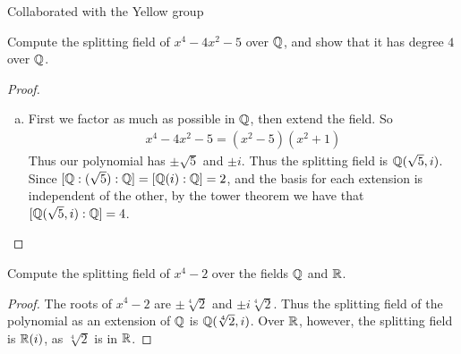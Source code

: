 \documentclass[num=7,duedate=03-24-21,course=Algebra\ II,proflastname=Walton]{hwtemplate}
\begin{document}

% 

\maketitle
Collaborated with the Yellow group
\pagebreak
\problem[1]
\begin{claim}
	Compute the splitting field of \(x^{4}-4x^2-5\) over \(\mathbb{Q}\), and show that it has degree \(4\) over \(\mathbb{Q}\).
\end{claim}

\begin{proof}
	\begin{enumerate}[(a).]
		\item First we factor as much as possible in \(\mathbb{Q}\), then extend the field. So
			\begin{align*}
				x^{4}-4x^2-5 = (x^2-5)(x^2+1)
			\end{align*}
			Thus our polynomial has \(\pm \sqrt{5} \) and \(\pm i\). Thus the splitting field is \(\mathbb{Q}(\sqrt{5} ,i)\). Since \([\mathbb{Q}:(\sqrt{5} ):\mathbb{Q}] = [\mathbb{Q}(i):\mathbb{Q}]=2\), and the basis for each extension is independent of the other, by the tower theorem we have that \([\mathbb{Q}(\sqrt{5} ,i):\mathbb{Q}] = 4\).
\end{enumerate}
\end{proof}

\problem[2]
\begin{claim}
	Compute the splitting field of \(x^{4}-2\) over the fields \(\mathbb{Q}\) and \(\mathbb{R}\).
\end{claim}
\begin{proof}
	The roots of \(x^{4}-2\) are \(\pm \sqrt[4]{2} \) and \(\pm i\sqrt[4]{2} \). Thus the splitting field of the polynomial as an extension of \(\mathbb{Q}\) is \(\mathbb{Q}(\sqrt[4]{2},i) \). Over \(\mathbb{R}\), however, the splitting field is \(\mathbb{R}(i)\), as \(\sqrt[4]{2} \) is in \(\mathbb{R}\).
\end{proof}
\end{document}
